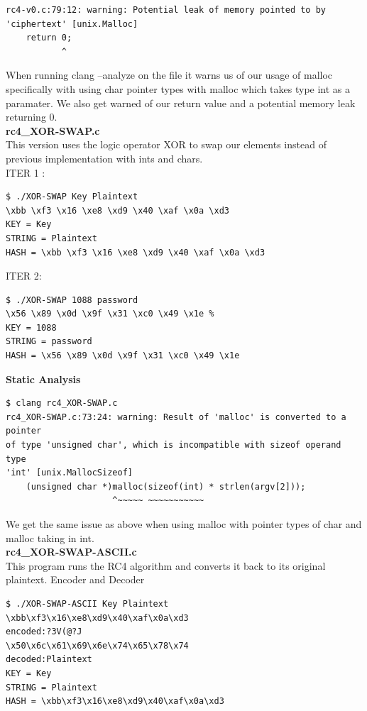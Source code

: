 \documentclass[12pt, letterpaper]{article}
\begin{document}
\begin{sloppypar}
\begin{verbatim}
rc4-v0.c:79:12: warning: Potential leak of memory pointed to by
'ciphertext' [unix.Malloc]
    return 0;
           ^
\end{verbatim}

When running clang --analyze on the file it warns us of our usage of
malloc specifically with using char pointer types with malloc which
takes type int as a paramater. We also get warned of our return value
and a potential memory leak returning 0. \\

\noindent \textbf{rc4\_XOR-SWAP.c}\\
This version uses the logic operator XOR to swap our elements instead of
previous implementation with ints and chars. \\

\noindent ITER 1 :

\begin{verbatim}
$ ./XOR-SWAP Key Plaintext
\xbb \xf3 \x16 \xe8 \xd9 \x40 \xaf \x0a \xd3
KEY = Key
STRING = Plaintext
HASH = \xbb \xf3 \x16 \xe8 \xd9 \x40 \xaf \x0a \xd3
\end{verbatim}

\noindent ITER 2:

\begin{verbatim}
$ ./XOR-SWAP 1088 password
\x56 \x89 \x0d \x9f \x31 \xc0 \x49 \x1e %
KEY = 1088
STRING = password
HASH = \x56 \x89 \x0d \x9f \x31 \xc0 \x49 \x1e
\end{verbatim}

\textbf{Static Analysis}
\begin{verbatim}
$ clang rc4_XOR-SWAP.c
rc4_XOR-SWAP.c:73:24: warning: Result of 'malloc' is converted to a pointer 
of type 'unsigned char', which is incompatible with sizeof operand type 
'int' [unix.MallocSizeof]
    (unsigned char *)malloc(sizeof(int) * strlen(argv[2]));
                     ^~~~~~ ~~~~~~~~~~~
\end{verbatim}
\noindent We get the same issue as above when using malloc with pointer types of 
char and malloc taking in int. \\

\noindent \textbf{rc4\_XOR-SWAP-ASCII.c}\\

\noindent This program runs the RC4 algorithm and converts it back to its original
plaintext. Encoder and Decoder 

\begin{verbatim}
$ ./XOR-SWAP-ASCII Key Plaintext
\xbb\xf3\x16\xe8\xd9\x40\xaf\x0a\xd3
encoded:?3V(@?J
\x50\x6c\x61\x69\x6e\x74\x65\x78\x74
decoded:Plaintext
KEY = Key
STRING = Plaintext
HASH = \xbb\xf3\x16\xe8\xd9\x40\xaf\x0a\xd3
\end{verbatim}


\end{sloppypar}
\end{document}
